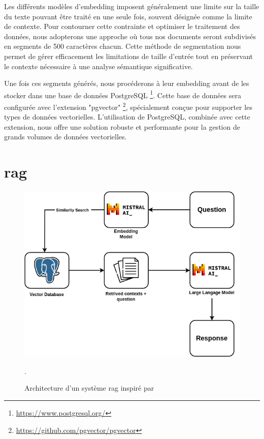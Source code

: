 Les différents modèles d'embedding imposent généralement une limite sur la taille du texte pouvant être traité en une seule fois, souvent désignée comme la limite de contexte. Pour contourner cette contrainte et optimiser le traitement des données, nous adopterons une approche où tous nos documents seront subdivisés en segments de 500 caractères chacun. Cette méthode de segmentation nous permet de gérer efficacement les limitations de taille d'entrée tout en préservant le contexte nécessaire à une analyse sémantique significative.

Une fois ces segments générés, nous procéderons à leur embedding avant de les stocker dans une base de données PostgreSQL \footnote{\href{https://www.postgresql.org/}{https://www.postgresql.org/}}. Cette base de données sera configurée avec l'extension "pgvector" \footnote{\href{https://github.com/pgvector/pgvector}{https://github.com/pgvector/pgvector}}, spécialement conçue pour supporter les types de données vectorielles. L'utilisation de PostgreSQL, combinée avec cette extension, nous offre une solution robuste et performante pour la gestion de grands volumes de données vectorielles.

\newpage
\section{\acf{rag}}

\begin{figure}[H]
    \centering
    \includegraphics[width=12cm]{gfx/fig-rag-architecture.png}
    \caption{Architecture d'un système \ac{rag} inspiré par \cite{rag_architecture}}.
    \label{fig:rag-architecture}
\end{figure}

